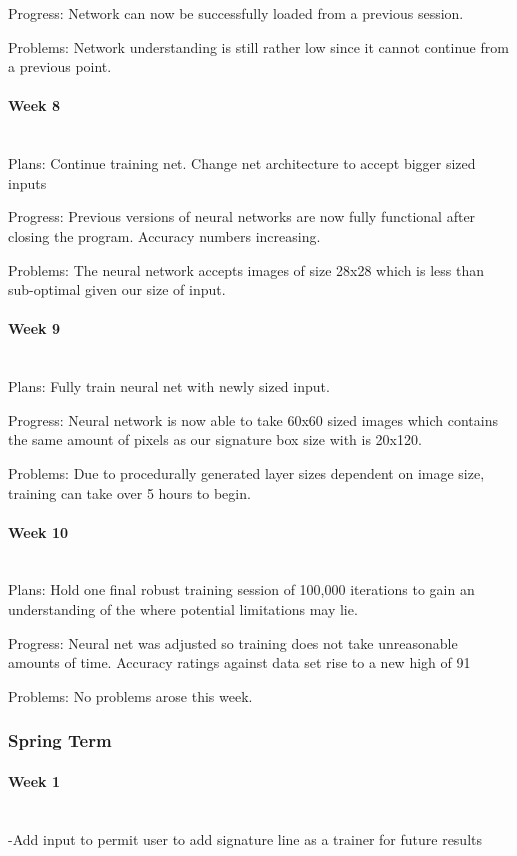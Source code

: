 \documentclass[article, onecolumn, draftclsnofoot,10pt, compsoc]{IEEEtran}
\begin{document}
Progress: 
Network can now be successfully loaded from a previous session. 
 
Problems: 
Network understanding is still rather low since it cannot continue from a previous point. 

\paragraph{Week 8}
\mbox{}\\
Plans: 
Continue training net. Change net architecture to accept bigger sized inputs 
 
Progress: 
Previous versions of neural networks are now fully functional after closing the program. Accuracy numbers increasing. 
 
Problems: 
The neural network accepts images of size 28x28 which is less than sub-optimal given our size of input. 

\paragraph{Week 9}
\mbox{}\\
Plans: 
Fully train neural net with newly sized input. 
 
Progress: 
Neural network is now able to take 60x60 sized images which contains the same amount of pixels as our signature box size with is 20x120. 
 
Problems: 
Due to procedurally generated layer sizes dependent on image size, training can take over 5 hours to begin.  

\paragraph{Week 10}
\mbox{}\\
Plans: 
Hold one final robust training session of 100,000 iterations to gain an understanding of the where potential limitations may lie.  
 
Progress: 
Neural net was adjusted so training does not take unreasonable amounts of time. Accuracy ratings against data set rise to a new high of 91%
 
Problems: 
No problems arose this week. 

\subsubsection{Spring Term}
\paragraph{Week 1}
\mbox{}\\
-Add input to permit user to add signature line as a trainer for future results 
\end{document}
